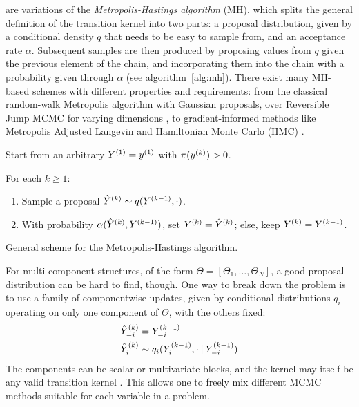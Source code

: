  are variations of the \emph{Metropolis-Hastings algorithm}
(MH), which splits the general definition of the transition kernel into two parts: a proposal
distribution, given by a conditional density \(q\) that needs to be easy to sample from, and an
acceptance rate \(\alpha\).  Subsequent samples are then produced by proposing values from \(q\)
given the previous element of the chain, and incorporating them into the chain with a probability
given through \(\alpha\) (see algorithm~\ref{alg:mh}). There exist
many MH-based schemes with different properties and requirements: from the classical random-walk
Metropolis algorithm with Gaussian proposals, over Reversible Jump MCMC for varying dimensions
\parencite{green1995reversible}, to gradient-informed methods like Metropolis Adjusted Langevin and
Hamiltonian Monte Carlo (HMC) \parencite{betancourt2018conceptual,girolami2011riemann}.

\begin{algorithm}[t]
  \begin{myalgorithmic}
  \item Start from an arbitrary \(\kth[1]{Y} = \kth[1]{y}\) with \(\pi(\kth{y}) > 0\).
  \item For each \(k \ge 1\):
    \begin{enumerate}
    \item Sample a proposal \(\kth[k]{\hat{Y}} \from q(\kth[k-1]{Y}, \cdot)\).
    \item With probability \(\alpha(\kth[k]{\hat{Y}}, \kth[k-1]{Y})\), set
      \(\kth[k]{Y} = \kth[k]{\hat{Y}}\); else, keep \(\kth[k]{Y} = \kth[k-1]{Y}\).
    \end{enumerate}
  \end{myalgorithmic}
  \caption{General scheme for the Metropolis-Hastings algorithm.\label{alg:mh}}
\end{algorithm}

For multi-component structures, of the form \(\Theta = [\Theta_1, \ldots, \Theta_N]\), a good
proposal distribution can be hard to find, though.  One way to break down the problem is to use a
family of componentwise updates, given by conditional distributions \(q_{i}\) operating on only one
component of \(\Theta\), with the others fixed:
\begin{equation}
  \label{eq:conditional-kernels}
  \begin{aligned}
    \kth[k]{\hat{Y}}_{-i} &= \kth[k-1]{Y}_{-i} \\
    \kth[k]{\hat{Y}}_{i} &\from q_{i}(\kth[k-1]{Y}_{i}, \cdot \given \kth[k-1]{Y}_{-i})
  \end{aligned}
\end{equation}
The components can be scalar or multivariate blocks, and the kernel may itself be any valid
transition kernel \parencite[chapter 6.6]{vihola2020lectures}.  This allows one to freely mix
different MCMC methods suitable for each variable in a problem.

